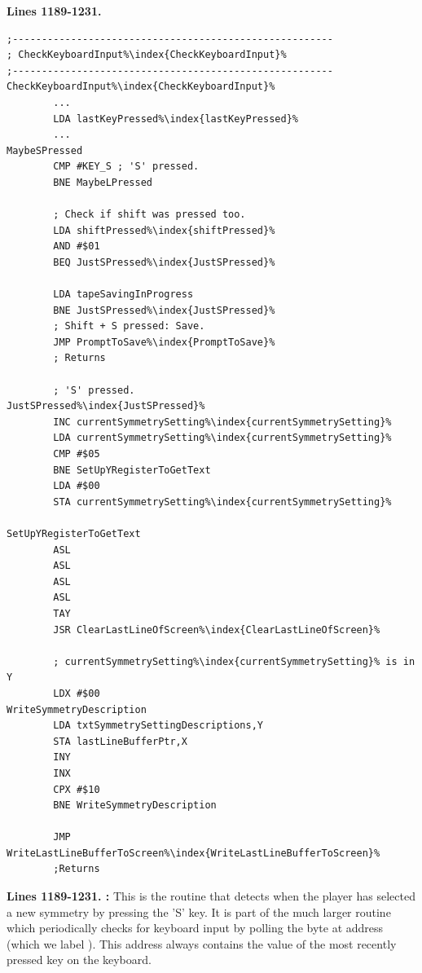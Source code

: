 \clearpage
\textbf{Lines 1189-1231. }
\begin{lstlisting}[escapechar=\%]
;-------------------------------------------------------
; CheckKeyboardInput%\index{CheckKeyboardInput}%
;-------------------------------------------------------
CheckKeyboardInput%\index{CheckKeyboardInput}%   
        ...
        LDA lastKeyPressed%\index{lastKeyPressed}%
        ...
MaybeSPressed   
        CMP #KEY_S ; 'S' pressed.
        BNE MaybeLPressed

        ; Check if shift was pressed too.
        LDA shiftPressed%\index{shiftPressed}%
        AND #$01
        BEQ JustSPressed%\index{JustSPressed}%

        LDA tapeSavingInProgress
        BNE JustSPressed%\index{JustSPressed}%
        ; Shift + S pressed: Save.
        JMP PromptToSave%\index{PromptToSave}%
        ; Returns

        ; 'S' pressed. 
JustSPressed%\index{JustSPressed}%   
        INC currentSymmetrySetting%\index{currentSymmetrySetting}%
        LDA currentSymmetrySetting%\index{currentSymmetrySetting}%
        CMP #$05
        BNE SetUpYRegisterToGetText
        LDA #$00
        STA currentSymmetrySetting%\index{currentSymmetrySetting}%

SetUpYRegisterToGetText   
        ASL 
        ASL 
        ASL 
        ASL 
        TAY 
        JSR ClearLastLineOfScreen%\index{ClearLastLineOfScreen}%

        ; currentSymmetrySetting%\index{currentSymmetrySetting}% is in Y
        LDX #$00
WriteSymmetryDescription   
        LDA txtSymmetrySettingDescriptions,Y
        STA lastLineBufferPtr,X
        INY 
        INX 
        CPX #$10
        BNE WriteSymmetryDescription

        JMP WriteLastLineBufferToScreen%\index{WriteLastLineBufferToScreen}%
        ;Returns
\end{lstlisting}
\clearpage

\textbf{Lines 1189-1231. :} This is the routine that detects when the player has selected a new
symmetry by pressing the 'S' key. It is part of the much larger routine  which periodically checks
for keyboard input by polling the byte at address  (which we label ). This address always
contains the value of the most recently pressed key on the keyboard.

